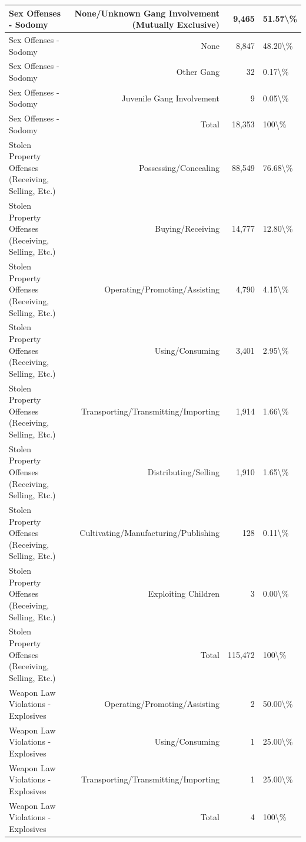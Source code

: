 \documentclass[
]{krantz}
\begin{document}
\begin{longtable}[t]{l|r|r|l}
\hline
Sex Offenses - Sodomy & None/Unknown Gang Involvement (Mutually Exclusive) & 9,465 & 51.57\textbackslash{}\%\\
\hline
Sex Offenses - Sodomy & None & 8,847 & 48.20\textbackslash{}\%\\
\hline
Sex Offenses - Sodomy & Other Gang & 32 & 0.17\textbackslash{}\%\\
\hline
Sex Offenses - Sodomy & Juvenile Gang Involvement & 9 & 0.05\textbackslash{}\%\\
\hline
Sex Offenses - Sodomy & Total & 18,353 & 100\textbackslash{}\%\\
\hline
Stolen Property Offenses (Receiving, Selling, Etc.) & Possessing/Concealing & 88,549 & 76.68\textbackslash{}\%\\
\hline
Stolen Property Offenses (Receiving, Selling, Etc.) & Buying/Receiving & 14,777 & 12.80\textbackslash{}\%\\
\hline
Stolen Property Offenses (Receiving, Selling, Etc.) & Operating/Promoting/Assisting & 4,790 & 4.15\textbackslash{}\%\\
\hline
Stolen Property Offenses (Receiving, Selling, Etc.) & Using/Consuming & 3,401 & 2.95\textbackslash{}\%\\
\hline
Stolen Property Offenses (Receiving, Selling, Etc.) & Transporting/Transmitting/Importing & 1,914 & 1.66\textbackslash{}\%\\
\hline
Stolen Property Offenses (Receiving, Selling, Etc.) & Distributing/Selling & 1,910 & 1.65\textbackslash{}\%\\
\hline
Stolen Property Offenses (Receiving, Selling, Etc.) & Cultivating/Manufacturing/Publishing & 128 & 0.11\textbackslash{}\%\\
\hline
Stolen Property Offenses (Receiving, Selling, Etc.) & Exploiting Children & 3 & 0.00\textbackslash{}\%\\
\hline
Stolen Property Offenses (Receiving, Selling, Etc.) & Total & 115,472 & 100\textbackslash{}\%\\
\hline
Weapon Law Violations - Explosives & Operating/Promoting/Assisting & 2 & 50.00\textbackslash{}\%\\
\hline
Weapon Law Violations - Explosives & Using/Consuming & 1 & 25.00\textbackslash{}\%\\
\hline
Weapon Law Violations - Explosives & Transporting/Transmitting/Importing & 1 & 25.00\textbackslash{}\%\\
\hline
Weapon Law Violations - Explosives & Total & 4 & 100\textbackslash{}\%\\

\end{longtable}
\end{document}
